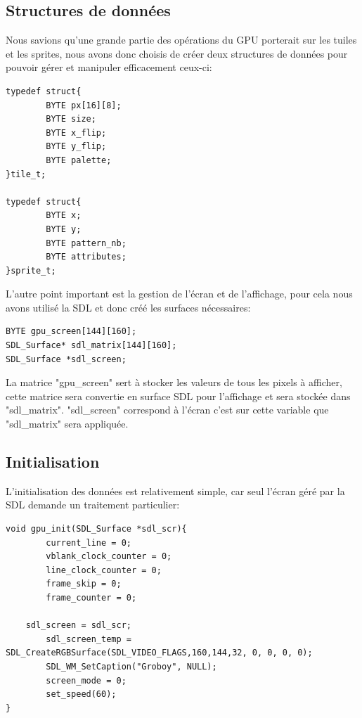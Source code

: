 \documentclass{report}
\begin{document}
\subsection{Structures de données}
	Nous savions qu'une grande partie des opérations du GPU porterait sur les tuiles et les sprites, nous avons donc choisis de créer deux structures de données pour pouvoir gérer et manipuler efficacement ceux-ci:\\ 
\begin{lstlisting}
typedef struct{
        BYTE px[16][8];
        BYTE size;
        BYTE x_flip;
        BYTE y_flip;
        BYTE palette;
}tile_t;

typedef struct{
        BYTE x;
        BYTE y;
        BYTE pattern_nb;
        BYTE attributes;
}sprite_t;
\end{lstlisting}

L'autre point important est la gestion de l'écran et de l'affichage, pour cela nous avons utilisé la SDL et donc créé les surfaces nécessaires:\\
\begin{lstlisting}
BYTE gpu_screen[144][160];
SDL_Surface* sdl_matrix[144][160];
SDL_Surface *sdl_screen;
\end{lstlisting}

La matrice "gpu\_screen" sert à stocker les valeurs de tous les pixels à afficher, cette matrice sera convertie en surface SDL pour l'affichage et sera stockée dans "sdl\_matrix". "sdl\_screen" correspond à l'écran c'est sur cette variable que "sdl\_matrix" sera appliquée.\\

\subsection{Initialisation}
	L'initialisation des données est relativement simple, car seul l'écran géré par la SDL demande un traitement particulier:\\
\begin{lstlisting}
void gpu_init(SDL_Surface *sdl_scr){
        current_line = 0;
        vblank_clock_counter = 0;
        line_clock_counter = 0;
        frame_skip = 0;
        frame_counter = 0;
        
	sdl_screen = sdl_scr;
        sdl_screen_temp = SDL_CreateRGBSurface(SDL_VIDEO_FLAGS,160,144,32, 0, 0, 0, 0);
        SDL_WM_SetCaption("Groboy", NULL);
        screen_mode = 0;
        set_speed(60);
}

\end{lstlisting}
\end{document}
